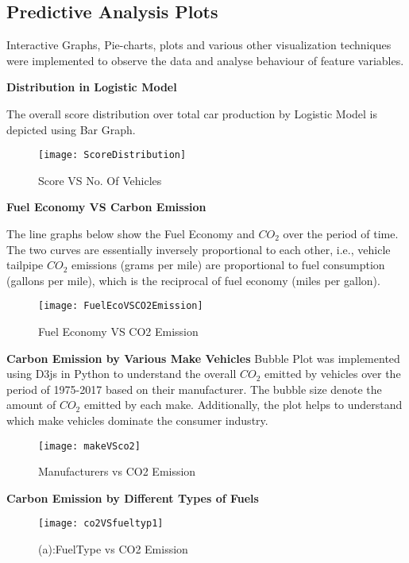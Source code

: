 \documentclass{acm_proc_article-sp}
\begin{document}
\subsection{Predictive Analysis Plots}
Interactive Graphs, Pie-charts, plots and various other visualization techniques were implemented to observe the data and analyse behaviour of feature variables. 

\textbf{Distribution in Logistic Model}

The overall score distribution over total car production by Logistic Model is depicted using Bar Graph.

\begin{figure}[H]
\centering
\texttt{[image: ScoreDistribution]}
\caption{Score VS No. Of Vehicles}
\end{figure}

\textbf{Fuel Economy VS Carbon Emission}

The line graphs below show the Fuel Economy and $CO_2$ over the period of time. The two curves are essentially inversely proportional to each other, i.e., vehicle tailpipe $CO_{2}$ 
emissions (grams per mile) are proportional to fuel consumption (gallons per mile), which is the reciprocal of fuel economy (miles per gallon). 

\begin{figure}[H]
\centering
\texttt{[image: FuelEcoVSCO2Emission]}
\caption{Fuel Economy VS CO2 Emission}
\end{figure}

\textbf{Carbon Emission by Various Make Vehicles}
Bubble Plot was implemented using D3js in Python to understand the overall $CO_{2}$ emitted by vehicles over the period of 1975-2017 based on their manufacturer. The bubble size denote the amount of $CO_2$ emitted by each make. Additionally, the plot helps to understand which make vehicles dominate the consumer industry. 

\begin{figure}[H]
\centering
\texttt{[image: makeVSco2]}
\caption{Manufacturers vs CO2 Emission}
\end{figure}

\textbf{Carbon Emission by Different Types of Fuels}

\begin{figure}[H]
\centering
\texttt{[image: co2VSfueltyp1]}
\caption{(a):FuelType vs CO2 Emission}
\end{figure}
\end{document}
